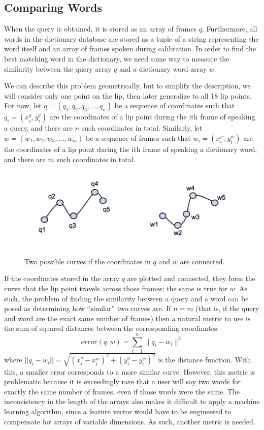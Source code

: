 \documentclass[10pt,twocolumn,letterpaper]{article}
\begin{document}
\subsection{Comparing Words}
When the query is obtained, it is stored as an array of frames $q$. Furthermore, all words in the dictionary database are stored as a tuple of a string representing the word itself and an array of frames spoken during calibration. In order to find the best matching word in the dictionary, we need some way to measure the similarity between the query array $q$ and a dictionary word array $w$.

We can describe this problem geometrically, but to simplify the description, we will consider only one point on the lip, then later generalize to all 18 lip points. For now, let $q = (q_1, q_2, q_3, \ldots, q_n)$ be a sequence of coordinates such that $q_i = (x_i^q, y_i^q)$ are the coordinates of a lip point during the ith frame of speaking a query, and there are $n$ such coordinates in total. Similarly, let $w = (w_1, w_2, w_3, \ldots, w_m)$ be a sequence of frames such that $w_i = (x_i^w, y_i^w)$ are the coordinates of a lip point during the ith frame of speaking a dictionary word, and there are $m$ such coordinates in total.

\begin{figure}[h]
\centering
\includegraphics{bo4}
\caption{Two possible curves if the coordinates in $q$ and $w$ are connected.}
\end{figure}

If the coordinates stored in the array $q$ are plotted and connected, they form the curve that the lip point travels across those frames; the same is true for $w$. As such, the problem of finding the similarity between a query and a word can be posed as determining how “similar” two curves are. If $n = m$ (that is, if the query and word are the exact same number of frames) then a natural metric to use is the sum of squared distances between the corresponding coordinates:
\begin{equation}
  error(q,w)=\sum_{i=1}^{n} \| q_i-w_i \| ^2
\end{equation}
where $||q_i-w_i|| = \sqrt{(x_i^q - x_i^w)^2 + (y_i^q - y_i^w)^2}$ is the distance function. With this, a smaller error corresponds to a more similar curve. However, this metric is problematic because it is exceedingly rare that a user will say two words for exactly the same number of frames, even if those words were the same. The inconsistency in the length of the arrays also makes it difficult to apply a machine learning algorithm, since a feature vector would have to be engineered to compensate for arrays of variable dimensions. As such, another metric is needed.
\end{document}
